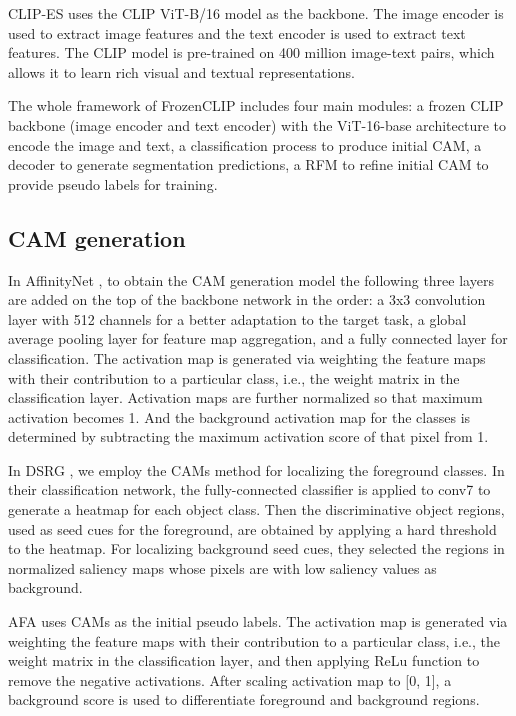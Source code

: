 CLIP-ES \cite{wsss_clip_es} uses the CLIP ViT-B/16 model as the backbone. The image encoder is used to extract image features and the text encoder is used to extract text features. The CLIP model is pre-trained on 400 million image-text pairs, which allows it to learn rich visual and textual representations.

The whole framework of FrozenCLIP \cite{wsss_frozen_clip} includes four main modules: a frozen CLIP backbone (image encoder and text encoder) with the ViT-16-base architecture\cite{transformer_vit} to encode the image and text, a classification process to produce initial CAM, a decoder to generate segmentation predictions, a RFM to refine initial  CAM to provide pseudo labels for training.

\subsection{CAM generation}
\label{subsec:cam-generation}
In AffinityNet \cite{wsss_affinitynet}, to obtain the CAM generation model the following three layers are added on the top of the backbone network in the order: a 3x3 convolution layer with 512 channels for a better adaptation to the target task, a global average pooling layer for feature map aggregation, and a fully connected layer for classification.  The activation map is generated via weighting the feature maps with their contribution to a particular class, i.e., the weight matrix in the classification layer. Activation maps are further normalized so that maximum activation becomes 1. And the background activation map for the classes is determined by subtracting the maximum activation score of that pixel from 1.

In DSRG \cite{wsss_dsrg_deep_seeded_region_growing}, we employ the CAMs \cite{cam} method for localizing the foreground classes. In their classification network, the fully-connected classifier is applied to conv7 to generate a heatmap for each object class. Then the discriminative object regions, used as seed cues for the foreground, are obtained by applying a hard threshold to the heatmap. For localizing background seed cues, they selected the regions in normalized saliency maps whose pixels are with low saliency values as background.

AFA \cite{wsss_afa_affinity_from_attention} uses CAMs as the initial pseudo labels. The activation map is generated via weighting the feature maps with their contribution to a particular class, i.e., the weight matrix in the classification layer, and then applying  ReLu function to remove the negative activations. After scaling activation map to [0, 1], a background score is used to differentiate foreground and background regions.

